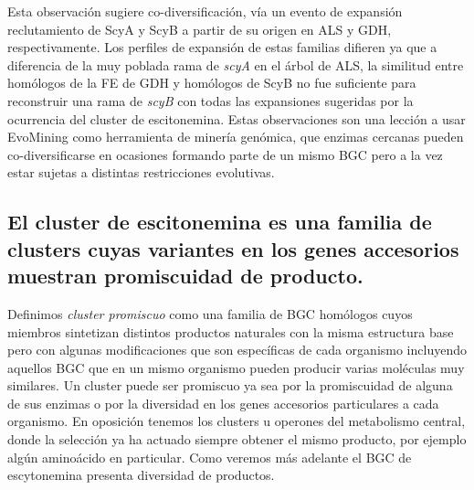 \documentclass[12pt,twoside]{reedthesis}
\begin{document}
  Esta observación sugiere co-diversificación, vía un evento de expansión
  reclutamiento de ScyA y ScyB a partir de su origen en ALS y GDH,
  respectivamente. Los perfiles de expansión de estas familias difieren ya
  que a diferencia de la muy poblada rama de \emph{scyA} en el árbol de
  ALS, la similitud entre homólogos de la FE de GDH y homólogos de ScyB no
  fue suficiente para reconstruir una rama de \emph{scyB} con todas las
  expansiones sugeridas por la ocurrencia del cluster de escitonemina.
  Estas observaciones son una lección a usar EvoMining como herramienta de
  minería genómica, que enzimas cercanas pueden co-diversificarse en
  ocasiones formando parte de un mismo BGC pero a la vez estar sujetas a
  distintas restricciones evolutivas.
  
  \subsection{El cluster de escitonemina es una familia de clusters cuyas
  variantes en los genes accesorios muestran promiscuidad de
  producto.}\label{el-cluster-de-escitonemina-es-una-familia-de-clusters-cuyas-variantes-en-los-genes-accesorios-muestran-promiscuidad-de-producto.}
  
  Definimos \emph{cluster promiscuo} como una familia de BGC homólogos
  cuyos miembros sintetizan distintos productos naturales con la misma
  estructura base pero con algunas modificaciones que son específicas de
  cada organismo incluyendo aquellos BGC que en un mismo organismo pueden
  producir varias moléculas muy similares. Un cluster puede ser promiscuo
  ya sea por la promiscuidad de alguna de sus enzimas o por la diversidad
  en los genes accesorios particulares a cada organismo. En oposición
  tenemos los clusters u operones del metabolismo central, donde la
  selección ya ha actuado siempre obtener el mismo producto, por ejemplo
  algún aminoácido en particular. Como veremos más adelante el BGC de
  escytonemina presenta diversidad de productos.
  
\end{document}
